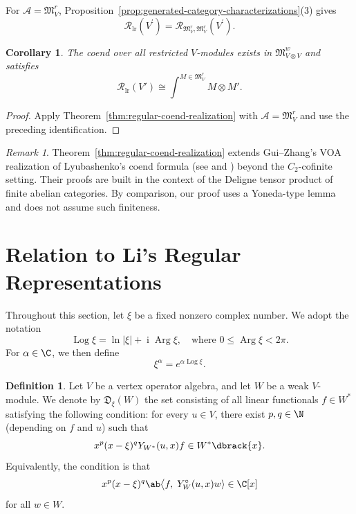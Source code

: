 \documentclass[12pt, english]{article}
\numberwithin{equation}{section}
\DeclareMathOperator{\lr}{lr}
\DeclareMathOperator{\Log}{Log}
\DeclareMathOperator{\Arg}{Arg}
\theoremstyle{plain}
\newtheorem{corollary}[lemma]{Corollary}
\theoremstyle{definition}
\newtheorem{definition}[lemma]{Definition}
\theoremstyle{remark}
\newtheorem{remark}[lemma]{Remark}
\begin{document}
	For $\mathcal{A} = \mathfrak{M}^r_V$, Proposition~\ref{prop:generated-category-characterizations}(3) gives
	\[
	\mathcal{R}_{\lr}(V^\prime)
	= \mathcal{R}_{\mathfrak{M}^r_V, \mathfrak{M}^r_V}(V^\prime).
	\]
	
	\begin{corollary}\label{cor:restricted-coend-realization}
		The coend over all restricted
		$V$-modules exists in $\mathfrak{M}^w_{V\otimes V}$ and satisfies
		\[
		\mathcal{R}_{\lr}(V')
		\cong\int^{M\in\mathfrak{M}^r_V}M\otimes M'.
		\]
	\end{corollary}
	
	\begin{proof}
		Apply Theorem~\ref{thm:regular-coend-realization} with
		$\mathcal{A}=\mathfrak{M}^r_V$ and use the preceding identification.
	\end{proof}
	
	
	
	
	
	
	
	\begin{remark}
		Theorem~\ref{thm:regular-coend-realization} extends Gui--Zhang's VOA realization of Lyubashenko's coend formula (see \cite[Corollary~2.34]{GZ25} and \cite[Theorem~0.1]{GZ26b}) beyond the $C_2$-cofinite setting. Their proofs are built in the context of the Deligne tensor product of finite abelian categories. By comparison, our proof uses a Yoneda-type lemma and does not assume such finiteness.
	\end{remark}
	
	\section{Relation to Li's Regular Representations} \label{sec:li-comparison}
	
	Throughout this section, let $\xi$ be a fixed nonzero complex number. We adopt the notation
	\[
	\Log \xi = \ln | \xi | + \operatorname{i} \Arg \xi, \quad \text{where } 0 \leq \Arg \xi < 2\pi.
	\]
	For $\alpha \in \C $, we then define
	\[
	{\xi}^{\alpha} = e^{\alpha \Log \xi}.
	\]
	\begin{definition} \cite{Li02}
		Let $V$ be a vertex operator algebra, and let $W$ be a weak $V$-module.
		We denote by $\mathfrak{D}_{\xi}(W)$ the set consisting of all linear functionals $f \in W^*$ satisfying the following condition:
		for every $u \in V$, there exist $p, q \in \N$ (depending on $f$ and $u$)  such that
		\begin{equation}\label{eq:li-functional-condition}
			x^p(x-\xi)^qY_{W^*}(u, x) f \in W^*\dbrack{x}.
		\end{equation}
		Equivalently, the condition is that
		\[
		x^p(x-\xi)^q \ab\big \langle f, \; Y^\circ_W(u, x) w\rangle \in \C[x]
		\]
		for all $w \in W$.
		
	\end{definition}
	
\end{document}
